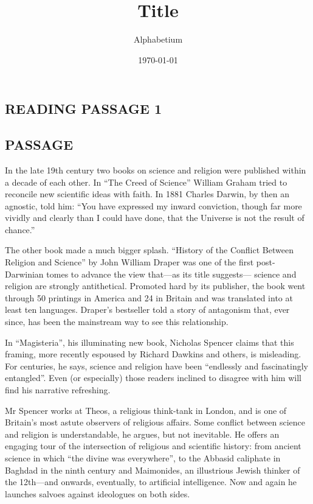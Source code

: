 \documentclass[10pt, a4paper, oneside]{article}
\title{Title}
\date{\today}
\author{Alphabetium}
\begin{document}
\begin{spacing}{2.0}
\maketitle


\section{READING PASSAGE 1}
\subsection{PASSAGE}
In the late 19th century two books on science and religion were published within a decade of each other.
In “The Creed of Science” William Graham tried to reconcile new scientific ideas with faith. In 1881
Charles Darwin, by then an agnostic, told him: “You have expressed my inward conviction, though far more
vividly and clearly than I could have done, that the Universe is not the result of chance.”

The other book made a much bigger splash. “History of the Conflict Between Religion and Science” by John
William Draper was one of the first post-Darwinian tomes to advance the view that—as its title suggests—
science and religion are strongly antithetical. Promoted hard by its publisher, the book went through 50
printings in America and 24 in Britain and was translated into at least ten languages. Draper's bestseller told a story of antagonism that,
ever since, has been the mainstream way to see this relationship.

In “Magisteria”, his illuminating new book, Nicholas Spencer claims that this framing, more recently 
espoused by Richard Dawkins and others, is misleading. For centuries, he says, science and religion have
been “endlessly and fascinatingly entangled”. Even (or especially) those readers inclined to disagree with
him will find his narrative refreshing.

Mr Spencer works at Theos, a religious think-tank in London, and is one of Britain's most astute observers of religious affairs. 
Some conflict between science and religion is understandable, he argues, but not
inevitable. He offers an engaging tour of the intersection of religious and scientific history: from ancient science in which 
“the divine was everywhere”, to the Abbasid caliphate in Baghdad in the ninth century and Maimonides, an illustrious Jewish thinker 
of the 12th—and onwards, eventually, to artificial intelligence. Now and again he launches salvoes against ideologues on both sides.


\end{spacing}
\end{document}
